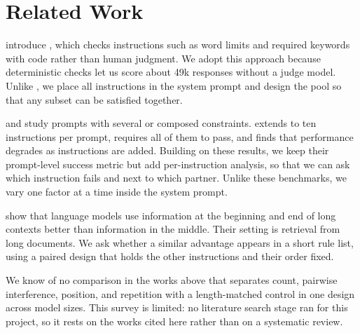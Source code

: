 \section{Related Work}
\label{sec:related}

 \citet{zhou2023ifeval} introduce \ifeval, which checks instructions such as word limits and required keywords with code rather than human judgment. We adopt this approach because deterministic checks let us score about 49k responses without a judge model. Unlike \ifeval, we place all instructions in the system prompt and design the pool so that any subset can be satisfied together.

 \followbench \citep{jiang2024followbench} and \complexbench \citep{wen2024complexbench} study prompts with several or composed constraints. \manyifeval \citep{harada2025multiply} extends \ifeval to ten instructions per prompt, requires all of them to pass, and finds that performance degrades as instructions are added. Building on these results, we keep their prompt-level success metric but add per-instruction analysis, so that we can ask which instruction fails and next to which partner. Unlike these benchmarks, we vary one factor at a time inside the system prompt.

 \citet{liu2024lost} show that language models use information at the beginning and end of long contexts better than information in the middle. Their setting is retrieval from long documents. We ask whether a similar advantage appears in a short rule list, using a paired design that holds the other instructions and their order fixed.

 We know of no comparison in the works above that separates count, pairwise interference, position, and repetition with a length-matched control in one design across model sizes. This survey is limited: no literature search stage ran for this project, so it rests on the works cited here rather than on a systematic review.
